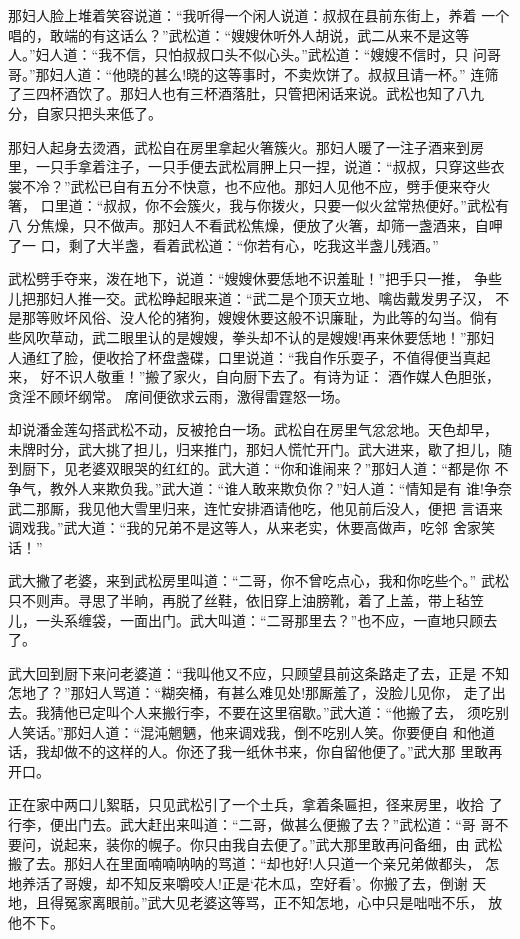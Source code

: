 那妇人脸上堆着笑容说道：“我听得一个闲人说道：叔叔在县前东街上，养着
一个唱的，敢端的有这话么？”武松道：“嫂嫂休听外人胡说，武二从来不是这等
人。”妇人道：“我不信，只怕叔叔口头不似心头。”武松道：“嫂嫂不信时，只
问哥哥。”那妇人道：“他晓的甚么!晓的这等事时，不卖炊饼了。叔叔且请一杯。”
连筛了三四杯酒饮了。那妇人也有三杯酒落肚，只管把闲话来说。武松也知了八九
分，自家只把头来低了。

那妇人起身去烫酒，武松自在房里拿起火箸簇火。那妇人暖了一注子酒来到房
里，一只手拿着注子，一只手便去武松肩胛上只一捏，说道：“叔叔，只穿这些衣
裳不冷？”武松已自有五分不快意，也不应他。那妇人见他不应，劈手便来夺火箸，
口里道：“叔叔，你不会簇火，我与你拨火，只要一似火盆常热便好。”武松有八
分焦燥，只不做声。那妇人不看武松焦燥，便放了火箸，却筛一盏酒来，自呷了一
口，剩了大半盏，看着武松道：“你若有心，吃我这半盏儿残酒。”

武松劈手夺来，泼在地下，说道：“嫂嫂休要恁地不识羞耻！”把手只一推，
争些儿把那妇人推一交。武松睁起眼来道：“武二是个顶天立地、噙齿戴发男子汉，
不是那等败坏风俗、没人伦的猪狗，嫂嫂休要这般不识廉耻，为此等的勾当。倘有
些风吹草动，武二眼里认的是嫂嫂，拳头却不认的是嫂嫂!再来休要恁地！”那妇
人通红了脸，便收拾了杯盘盏碟，口里说道：“我自作乐耍子，不值得便当真起来，
好不识人敬重！”搬了家火，自向厨下去了。有诗为证：
酒作媒人色胆张，贪淫不顾坏纲常。
席间便欲求云雨，激得雷霆怒一场。

却说潘金莲勾搭武松不动，反被抢白一场。武松自在房里气忿忿地。天色却早，
未牌时分，武大挑了担儿，归来推门，那妇人慌忙开门。武大进来，歇了担儿，随
到厨下，见老婆双眼哭的红红的。武大道：“你和谁闹来？”那妇人道：“都是你
不争气，教外人来欺负我。”武大道：“谁人敢来欺负你？”妇人道：“情知是有
谁!争奈武二那厮，我见他大雪里归来，连忙安排酒请他吃，他见前后没人，便把
言语来调戏我。”武大道：“我的兄弟不是这等人，从来老实，休要高做声，吃邻
舍家笑话！”

武大撇了老婆，来到武松房里叫道：“二哥，你不曾吃点心，我和你吃些个。”
武松只不则声。寻思了半晌，再脱了丝鞋，依旧穿上油膀靴，着了上盖，带上毡笠
儿，一头系缠袋，一面出门。武大叫道：“二哥那里去？”也不应，一直地只顾去
了。

武大回到厨下来问老婆道：“我叫他又不应，只顾望县前这条路走了去，正是
不知怎地了？”那妇人骂道：“糊突桶，有甚么难见处!那厮羞了，没脸儿见你，
走了出去。我猜他已定叫个人来搬行李，不要在这里宿歇。”武大道：“他搬了去，
须吃别人笑话。”那妇人道：“混沌魍魉，他来调戏我，倒不吃别人笑。你要便自
和他道话，我却做不的这样的人。你还了我一纸休书来，你自留他便了。”武大那
里敢再开口。

正在家中两口儿絮聒，只见武松引了一个土兵，拿着条匾担，径来房里，收拾
了行李，便出门去。武大赶出来叫道：“二哥，做甚么便搬了去？”武松道：“哥
哥不要问，说起来，装你的幌子。你只由我自去便了。”武大那里敢再问备细，由
武松搬了去。那妇人在里面喃喃呐呐的骂道：“却也好!人只道一个亲兄弟做都头，
怎地养活了哥嫂，却不知反来嚼咬人!正是‘花木瓜，空好看’。你搬了去，倒谢
天地，且得冤家离眼前。”武大见老婆这等骂，正不知怎地，心中只是咄咄不乐，
放他不下。

